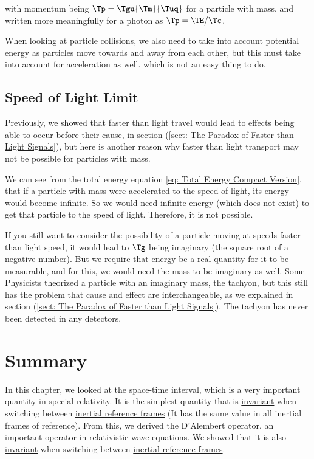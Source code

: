 with momentum being $\Tp  = \Tgu  {\Tm }{\Tuq }$ for a particle with mass, and written more meaningfully for a photon as $\Tp =\TE /\Tc $.

\sidenote

When looking at particle collisions, we also need to take into account potential energy as particles move towards and away from each other, but this must take into account for acceleration as well.
which is not an easy thing to do.

\subsection{Speed of Light Limit}\label{subsect: Speed of Light Limit}

Previously, we showed that faster than light travel would lead to effects being able to occur before their cause, in section (\ref{sect: The Paradox of Faster than Light Signals}), but here is another reason why faster than light transport may not be possible for particles with mass.

We can see from the total energy equation \eqref{eq: Total Energy Compact Version}, that if a particle with mass were accelerated to the speed of light, its energy would become infinite.
So we would need infinite energy (which does not exist) to get that particle to the speed of light.
Therefore, it is not possible.

If you still want to consider the possibility of a particle moving at speeds faster than light speed, it would lead to $\Tg $ being imaginary (the square root of a negative number).
But we require that energy be a real quantity for it to be measurable, and for this, we would need the mass to be imaginary as well.
Some Physicists theorized a particle with an imaginary mass, the tachyon, but this still has the problem that cause and effect are interchangeable, as we explained in section (\ref{sect: The Paradox of Faster than Light Signals}).
The tachyon has never been detected in any detectors.

\section{Summary}\label{sect: Summary chapter 3}

In this chapter, we looked at the space-time interval, which is a very important quantity in special relativity.
It is the simplest quantity that is \hyperlink{def-lorentz-invariant}{invariant} when switching between \hyperlink{def-Inertial-reference-frame}{inertial reference frames} (It has the same value in all inertial frames of reference).
From this, we derived the D'Alembert operator, an important operator in relativistic wave equations.
We showed that it is also \hyperlink{def-lorentz-invariant}{invariant} when switching between \hyperlink{def-Inertial-reference-frame}{inertial reference frames}.

